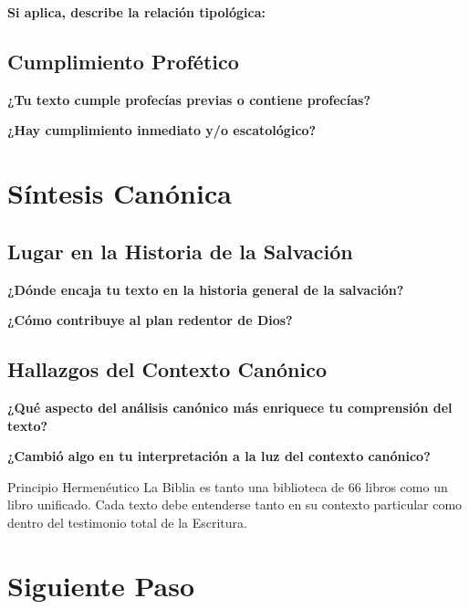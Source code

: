 \documentclass[11pt,a4paper]{article}
\begin{document}
\textbf{Si aplica, describe la relación tipológica:}
\vspace{3cm}

\subsection{Cumplimiento Profético}

\textbf{¿Tu texto cumple profecías previas o contiene profecías?}
\vspace{2cm}

\textbf{¿Hay cumplimiento inmediato y/o escatológico?}
\vspace{2cm}

\section{Síntesis Canónica}

\subsection{Lugar en la Historia de la Salvación}

\textbf{¿Dónde encaja tu texto en la historia general de la salvación?}
\vspace{3cm}

\textbf{¿Cómo contribuye al plan redentor de Dios?}
\vspace{3cm}

\subsection{Hallazgos del Contexto Canónico}

\textbf{¿Qué aspecto del análisis canónico más enriquece tu comprensión del texto?}
\vspace{3cm}

\textbf{¿Cambió algo en tu interpretación a la luz del contexto canónico?}
\vspace{3cm}

\begin{infobox}{Principio Hermenéutico}
La Biblia es tanto una biblioteca de 66 libros como un libro unificado. Cada texto debe entenderse tanto en su contexto particular como dentro del testimonio total de la Escritura.
\end{infobox}

\section{Siguiente Paso}
\end{document}
